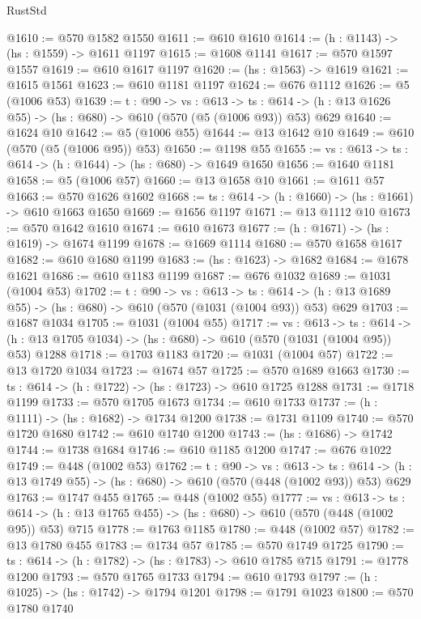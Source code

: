\begin{lexlean}{RustStd}
\begin{coremodule}
@1610 := @570 @1582 @1550
@1611 := @610 @1610
@1614 := (h : @1143) -> (hs : @1559) -> @1611 @1197
@1615 := @1608 @1141
@1617 := @570 @1597 @1557
@1619 := @610 @1617 @1197
@1620 := (hs : @1563) -> @1619
@1621 := @1615 @1561
@1623 := @610 @1181 @1197
@1624 := @676 @1112
@1626 := @5 (@1006 @53)
@1639 := {t : @90} ->
  {vs : @613} ->
  {ts : @614} -> (h : @13 @1626 @55) -> (hs : @680) -> @610 (@570 (@5 (@1006 @93)) @53) @629
@1640 := @1624 @10
@1642 := @5 (@1006 @55)
@1644 := @13 @1642 @10
@1649 := @610 (@570 (@5 (@1006 @95)) @53)
@1650 := @1198 @55
@1655 := {vs : @613} -> {ts : @614} -> (h : @1644) -> (hs : @680) -> @1649 @1650
@1656 := @1640 @1181
@1658 := @5 (@1006 @57)
@1660 := @13 @1658 @10
@1661 := @1611 @57
@1663 := @570 @1626 @1602
@1668 := {ts : @614} -> (h : @1660) -> (hs : @1661) -> @610 @1663 @1650
@1669 := @1656 @1197
@1671 := @13 @1112 @10
@1673 := @570 @1642 @1610
@1674 := @610 @1673
@1677 := (h : @1671) -> (hs : @1619) -> @1674 @1199
@1678 := @1669 @1114
@1680 := @570 @1658 @1617
@1682 := @610 @1680 @1199
@1683 := (hs : @1623) -> @1682
@1684 := @1678 @1621
@1686 := @610 @1183 @1199
@1687 := @676 @1032
@1689 := @1031 (@1004 @53)
@1702 := {t : @90} ->
  {vs : @613} ->
  {ts : @614} -> (h : @13 @1689 @55) -> (hs : @680) -> @610 (@570 (@1031 (@1004 @93)) @53) @629
@1703 := @1687 @1034
@1705 := @1031 (@1004 @55)
@1717 := {vs : @613} ->
  {ts : @614} -> (h : @13 @1705 @1034) -> (hs : @680) -> @610 (@570 (@1031 (@1004 @95)) @53) @1288
@1718 := @1703 @1183
@1720 := @1031 (@1004 @57)
@1722 := @13 @1720 @1034
@1723 := @1674 @57
@1725 := @570 @1689 @1663
@1730 := {ts : @614} -> (h : @1722) -> (hs : @1723) -> @610 @1725 @1288
@1731 := @1718 @1199
@1733 := @570 @1705 @1673
@1734 := @610 @1733
@1737 := (h : @1111) -> (hs : @1682) -> @1734 @1200
@1738 := @1731 @1109
@1740 := @570 @1720 @1680
@1742 := @610 @1740 @1200
@1743 := (hs : @1686) -> @1742
@1744 := @1738 @1684
@1746 := @610 @1185 @1200
@1747 := @676 @1022
@1749 := @448 (@1002 @53)
@1762 := {t : @90} ->
  {vs : @613} ->
  {ts : @614} -> (h : @13 @1749 @55) -> (hs : @680) -> @610 (@570 (@448 (@1002 @93)) @53) @629
@1763 := @1747 @455
@1765 := @448 (@1002 @55)
@1777 := {vs : @613} ->
  {ts : @614} -> (h : @13 @1765 @455) -> (hs : @680) -> @610 (@570 (@448 (@1002 @95)) @53) @715
@1778 := @1763 @1185
@1780 := @448 (@1002 @57)
@1782 := @13 @1780 @455
@1783 := @1734 @57
@1785 := @570 @1749 @1725
@1790 := {ts : @614} -> (h : @1782) -> (hs : @1783) -> @610 @1785 @715
@1791 := @1778 @1200
@1793 := @570 @1765 @1733
@1794 := @610 @1793
@1797 := (h : @1025) -> (hs : @1742) -> @1794 @1201
@1798 := @1791 @1023
@1800 := @570 @1780 @1740

\end{coremodule}
\end{lexlean}

